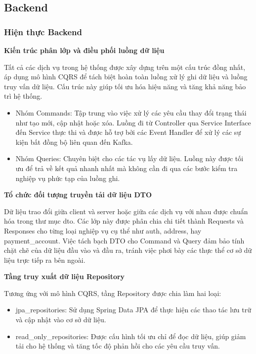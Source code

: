 \subsection{Backend}

\subsubsection{Hiện thực Backend}

\textbf{Kiến trúc phân lớp và điều phối luồng dữ liệu}

Tất cả các dịch vụ trong hệ thống được xây dựng trên một cấu trúc đồng nhất, áp dụng mô hình CQRS để tách biệt hoàn toàn luồng xử lý ghi dữ liệu và luồng truy vấn dữ liệu. Cấu trúc này giúp tối ưu hóa hiệu năng và tăng khả năng bảo trì hệ thống.

\begin{itemize}
    \item Nhóm Commands: Tập trung vào việc xử lý các yêu cầu thay đổi trạng thái như tạo mới, cập nhật hoặc xóa. Luồng đi từ Controller qua Service Interface đến Service thực thi và được hỗ trợ bởi các Event Handler để xử lý các sự kiện bất đồng bộ liên quan đến Kafka.
    \item Nhóm Queries: Chuyên biệt cho các tác vụ lấy dữ liệu. Luồng này được tối ưu để trả về kết quả nhanh nhất mà không cần đi qua các bước kiểm tra nghiệp vụ phức tạp của luồng ghi.
\end{itemize}

\textbf{Tổ chức đối tượng truyền tải dữ liệu DTO}

Dữ liệu trao đổi giữa client và server hoặc giữa các dịch vụ với nhau được chuẩn hóa trong thư mục dto. Các lớp này được phân chia chi tiết thành Requests và Responses cho từng loại nghiệp vụ cụ thể như auth, address, hay payment\_account. Việc tách bạch DTO cho Command và Query đảm bảo tính chặt chẽ của dữ liệu đầu vào và đầu ra, tránh việc phơi bày các thực thể cơ sở dữ liệu trực tiếp ra bên ngoài.

\textbf{Tầng truy xuất dữ liệu Repository}

Tương ứng với mô hình CQRS, tầng Repository được chia làm hai loại:

\begin{itemize}
    \item jpa\_repositories: Sử dụng Spring Data JPA để thực hiện các thao tác lưu trữ và cập nhật vào cơ sở dữ liệu.
    \item read\_only\_repositories: Được cấu hình tối ưu chỉ để đọc dữ liệu, giúp giảm tải cho hệ thống và tăng tốc độ phản hồi cho các yêu cầu truy vấn.
\end{itemize}

